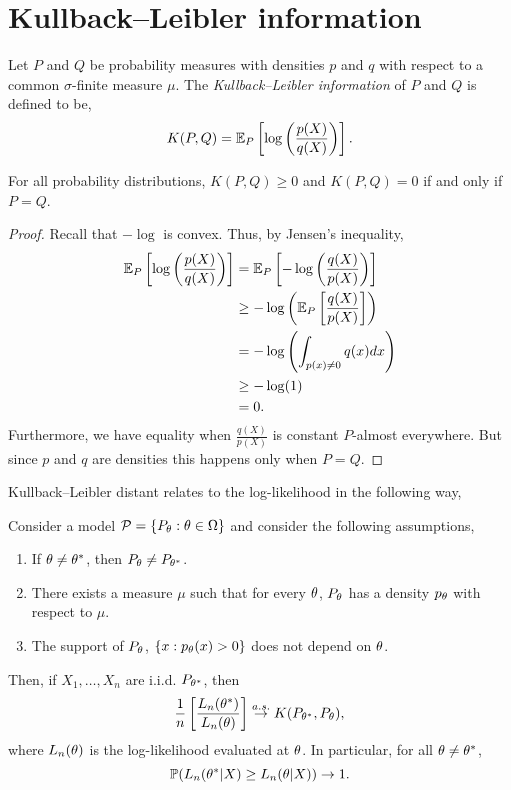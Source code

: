 \section{Kullback--Leibler information}
\begin{definition}
    Let $P$ and $Q$ be probability measures with densities $p$ and $q$ with respect to a common $\sigma$-finite measure $\mu$. The \emph{Kullback--Leibler information} of $P$ and $Q$ is defined to be,
    \[K(P,Q) = {\mathbb{E}}_P\left[
        \log\left(\frac{p(X)}{q(X)}\right)
    \right]. \]
\end{definition}
\begin{proposition}
    For all probability distributions, $K(P,Q) \ge 0$ and $K(P,Q)=0$ if and only if $P=Q$.
\end{proposition}
\begin{proof}
    Recall that $-\log$ is convex. Thus, by Jensen's inequality,
    \begin{align*}
        {\mathbb{E}}_P\left[\log\left(\frac{p(X)}{q(X)}\right)\right]&={\mathbb{E}}_P\left[-\log\left(\frac{q(X)}{p(X)}\right)\right]\\
        &\ge -\log\left({\mathbb{E}}_P\left[\frac{q(X)}{p(X)}\right]\right)\\
        &=-\log\left(\int_{p(x)\neq 0}q(x)dx\right)\\
        &\ge -\log(1)\\
        &=0.
    \end{align*}
    Furthermore, we have equality when $\frac{q(X)}{p(X)}$ is constant $P$-almost everywhere. But since $p$ and $q$ are densities this happens only when $P=Q$.
\end{proof}
Kullback--Leibler distant relates to the log-likelihood in the following way,
\begin{lemma}
    Consider a model ${\mathcal{P}} = \{P_{\theta} : {\theta} \in {{\Omega}}\}$ and consider the following assumptions,
    \begin{enumerate}
        \item If ${\theta} \neq {\theta}^*$, then $P_{\theta} \neq P_{{\theta}^*}$.
        \item There exists a measure $\mu$ such that for every ${\theta}$, $P_{\theta}$ has a density $p_{\theta}$ with respect to $\mu$.
        \item The support of $P_{\theta}$, $\{x : p_{\theta}(x)>0\}$ does not depend on ${\theta}$.
    \end{enumerate}
    Then, if $X_1,\ldots, X_n$ are i.i.d. $P_{{\theta}^*}$, then 
    \[\frac{1}{n}\left[\frac{L_n({\theta}^*)}{L_n({\theta})}\right] \stackrel{a.s.}{\to} K(P_{{\theta}^*},P_{\theta}),\]
    where $L_n({\theta})$ is the log-likelihood evaluated at ${\theta}$.  In particular, for all ${\theta}\neq {\theta}^*$,
    \[{\mathbb{P}}(L_n({\theta}^*|X) \ge L_n({\theta}|X)) \to 1.\] 
\end{lemma}
